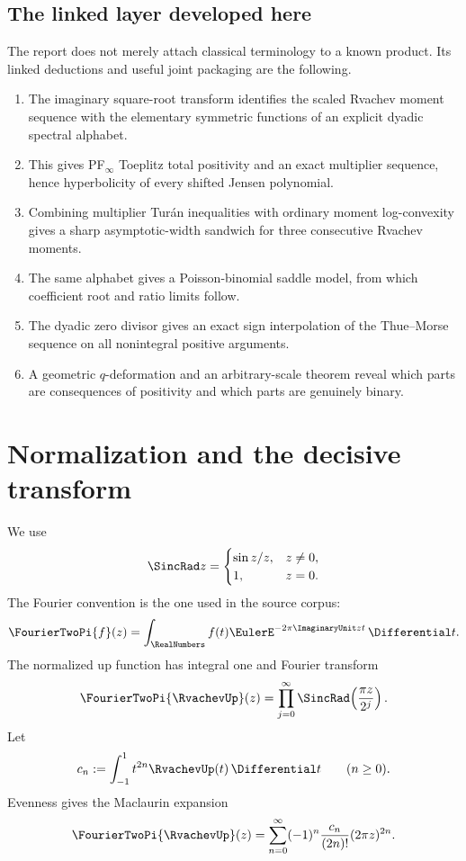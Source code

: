 \documentclass[11pt]{article}
\numberwithin{equation}{section}
\theoremstyle{definition}
\theoremstyle{remark}
\begin{document}
\subsection{The linked layer developed here}

The report does not merely attach classical terminology to a known product.
Its linked deductions and useful joint packaging are the following.
\begin{enumerate}[leftmargin=2.2em]
\item The imaginary square-root transform identifies the scaled Rvachev moment sequence with the elementary symmetric functions of an explicit dyadic spectral alphabet.
\item This gives PF$_\infty$ Toeplitz total positivity and an exact multiplier sequence, hence hyperbolicity of every shifted Jensen polynomial.
\item Combining multiplier Turán inequalities with ordinary moment log-convexity gives a sharp asymptotic-width sandwich for three consecutive Rvachev moments.
\item The same alphabet gives a Poisson-binomial saddle model, from which coefficient root and ratio limits follow.
\item The dyadic zero divisor gives an exact sign interpolation of the Thue--Morse sequence on all nonintegral positive arguments.
\item A geometric $q$-deformation and an arbitrary-scale theorem reveal which parts are consequences of positivity and which parts are genuinely binary.
\end{enumerate}

\section{Normalization and the decisive transform}\label{sec:normalization}

We use
\[
 \SincRad z=\begin{cases}\sin z/z,&z\ne0,\\1,&z=0.\end{cases}
\]
The Fourier convention is the one used in the source corpus:
\[
 \FourierTwoPi{f}(z)=\int_{\RealNumbers}f(t)\EulerE^{-2\pi\ImaginaryUnit zt}\,\Differential t.
\]
The normalized up function has integral one and Fourier transform
\begin{equation}\label{eq:up-product}
 \FourierTwoPi{\RvachevUp}(z)=\prod_{j=0}^{\infty}\SincRad\!\left(\frac{\pi z}{2^j}\right).
\end{equation}
Let
\begin{equation}\label{eq:moments}
 c_n:=\int_{-1}^{1}t^{2n}\RvachevUp(t)\,\Differential t\qquad(n\ge0).
\end{equation}
Evenness gives the Maclaurin expansion
\begin{equation}\label{eq:fourier-moment-expansion}
 \FourierTwoPi{\RvachevUp}(z)=\sum_{n=0}^{\infty}(-1)^n\frac{c_n}{(2n)!}(2\pi z)^{2n}.
\end{equation}
\end{document}
